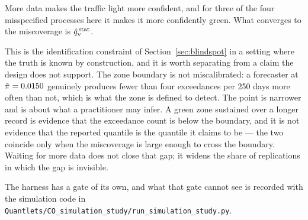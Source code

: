More data makes the traffic light more confident, and for three of the four
misspecified processes here it makes it more confidently green. What converges to
the miscoverage is $\hat{q}_{\scriptscriptstyle\mathrm{V}}^{\,\mathrm{stat}}$.

This is the identification constraint of Section~\ref{sec:blindspot} in a setting
where the truth is known by construction, and it is worth separating from a claim
the design does not support. The zone boundary is not miscalibrated: a forecaster at $\hat\pi = 0.0150$ genuinely produces fewer than four exceedances per
250 days more often than not, which is what the zone is defined to detect. The
point is narrower and is about what a practitioner may infer. A green zone
sustained over a longer record is evidence that the exceedance count is below the
boundary, and it is not evidence that the reported quantile is the quantile it
claims to be --- the two coincide only when the miscoverage is large enough to
cross the boundary. Waiting for more data does not close that gap; it widens the
share of replications in which the gap is invisible.

\medskip\noindent The harness has a gate of its own, and what that gate cannot see is recorded with the simulation code in \texttt{Quantlets/CO\_simulation\_study/run\_simulation\_study.py}.
